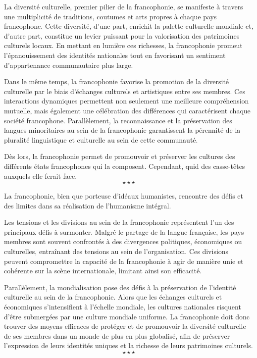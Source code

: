La diversité culturelle, premier pilier de la francophonie, se manifeste à travers une multiplicité de traditions, coutumes et arts propres à chaque pays francophone. Cette diversité, d'une part, enrichit la palette culturelle mondiale et, d'autre part, constitue un levier puissant pour la valorisation des patrimoines culturels locaux. En mettant en lumière ces richesses, la francophonie promeut l'épanouissement des identités nationales tout en favorisant un sentiment d'appartenance communautaire plus large.

Dans le même temps, la francophonie favorise la promotion de la diversité culturelle par le biais d'échanges culturels et artistiques entre ses membres. Ces interactions dynamiques permettent non seulement une meilleure compréhension mutuelle, mais également une célébration des différences qui caractérisent chaque société francophone. Parallèlement, la reconnaissance et la préservation des langues minoritaires au sein de la francophonie garantissent la pérennité de la pluralité linguistique et culturelle au sein de cette communauté.

Dès lors, la francophonie permet de promouvoir et préserver les cultures des différents états francophones qui la composent. Cependant, quid des casse-têtes auxquels elle ferait face.
$$\star \star \star$$

La francophonie, bien que porteuse d'idéaux humanistes, rencontre des défis et des limites dans sa réalisation de l'humanisme intégral.

Les tensions et les divisions au sein de la francophonie représentent l'un des principaux défis à surmonter. Malgré le partage de la langue française, les pays membres sont souvent confrontés à des divergences politiques, économiques ou culturelles, entraînant des tensions au sein de l'organisation. Ces divisions peuvent compromettre la capacité de la francophonie à agir de manière unie et cohérente sur la scène internationale, limitant ainsi son efficacité.

Parallèlement, la mondialisation pose des défis à la préservation de l'identité culturelle au sein de la francophonie. Alors que les échanges culturels et économiques s'intensifient à l'échelle mondiale, les cultures nationales risquent d'être submergées par une culture mondiale uniforme. La francophonie doit donc trouver des moyens efficaces de protéger et de promouvoir la diversité culturelle de ses membres dans un monde de plus en plus globalisé, afin de préserver l'expression de leurs identités uniques et la richesse de leurs patrimoines culturels.
$$\star \star \star$$

